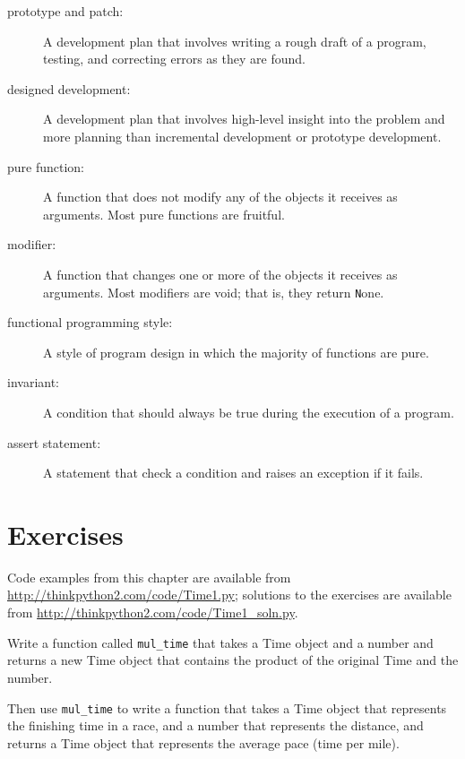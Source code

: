 \documentclass[
DIV=11,
fontsize=12,
twoside,
headinclude=false,
titlepage=firstiscover,
abstract=true,
headsepline=true,
footsepline=true,
chapterprefix=true, %
headings=big,
bibliography=totoc,%
captions=tableheading
]{scrbook}
\theoremstyle{definition}
\begin{document}
\begin{description}

\item[prototype and patch:] A development plan that involves
writing a rough draft of a program, testing, and correcting errors as
they are found.

\item[designed development:] A development plan that involves
high-level insight into the problem and more planning than incremental
development or prototype development.

\item[pure function:] A function that does not modify any of the objects it
receives as arguments.  Most pure functions are fruitful.

\item[modifier:] A function that changes one or more of the objects it
  receives as arguments.  Most modifiers are void; that is, they
  return {\texttt None}.  

\item[functional programming style:] A style of program design in which the
majority of functions are pure.

\item[invariant:] A condition that should always be true during the
execution of a program.

\item[assert statement:] A statement that check a condition and raises
an exception if it fails.

\end{description}


\section{Exercises}

Code examples from this chapter are available from
\url{http://thinkpython2.com/code/Time1.py}; solutions to the
exercises are available from \url{http://thinkpython2.com/code/Time1_soln.py}.

\begin{exercise}
\normalfont

Write a function called \verb"mul_time" that takes a Time object
and a number and returns a new Time object that contains
the product of the original Time and the number.

Then use \verb"mul_time" to write a function that takes a Time
object that represents the finishing time in a race, and a number
that represents the distance, and returns a Time object that represents
the average pace (time per mile).

\end{exercise}
\end{document}
